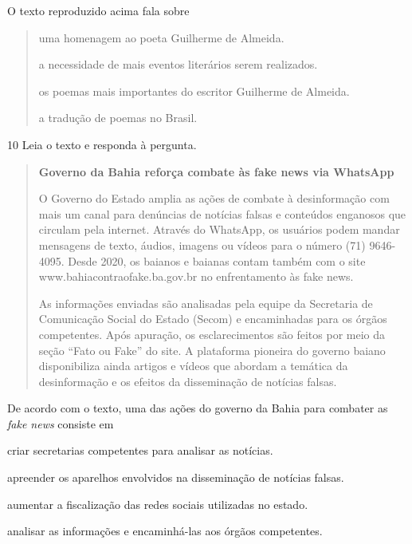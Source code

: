 O texto reproduzido acima fala sobre

\begin{quote}
  \item uma homenagem ao poeta Guilherme de Almeida.

  \item a necessidade de mais eventos literários serem realizados.

  \item os poemas mais importantes do escritor Guilherme de Almeida.

  \item a tradução de poemas no Brasil.
\end{quote}


\num{10} Leia o texto e responda à pergunta.

\begin{quote}
\textbf{Governo da Bahia reforça combate às fake news via WhatsApp}

O Governo do Estado amplia as ações de combate à desinformação com mais
um canal para denúncias de notícias falsas e conteúdos enganosos que
circulam pela internet. Através do WhatsApp, os usuários podem mandar
mensagens de texto, áudios, imagens ou vídeos para o número (71)
9646-4095. Desde 2020, os baianos e baianas contam também com o site
www.bahiacontraofake.ba.gov.br no enfrentamento às fake news.

As informações enviadas são analisadas pela equipe da Secretaria de
Comunicação Social do Estado (Secom) e encaminhadas para os órgãos
competentes. Após apuração, os esclarecimentos são feitos por meio da
seção ``Fato ou Fake'' do site. A plataforma pioneira do governo baiano
disponibiliza ainda artigos e vídeos que abordam a temática da
desinformação e os efeitos da disseminação de notícias falsas.
\end{quote}


De acordo com o texto, uma das ações do governo da Bahia para combater
as \textit{fake news} consiste em

\begin{escolha}

  \item criar secretarias competentes para analisar as notícias.

  \item apreender os aparelhos envolvidos na disseminação de notícias
falsas.

  \item aumentar a fiscalização das redes sociais utilizadas no estado.

  \item analisar as informações e encaminhá-las aos órgãos competentes.
\end{escolha}



